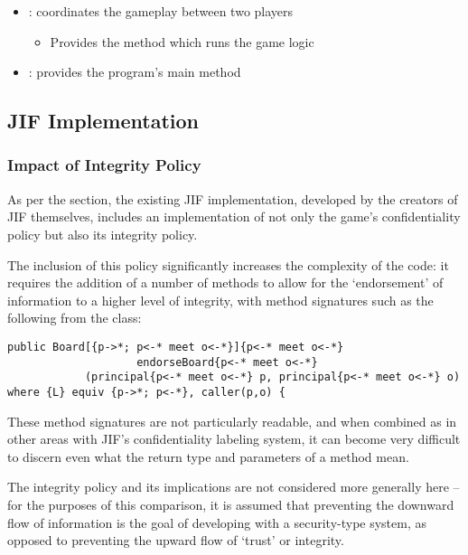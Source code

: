\begin{itemize}
	\item {}: coordinates the gameplay between two players
	
	\begin{itemize}
		\item Provides the method which runs the game logic
	\end{itemize}
	
	\item {}: provides the program's main method
\end{itemize}

\newpage

\subsection{JIF Implementation} \label{cs_battleships_jif_impl}

\subsubsection{Impact of Integrity Policy}

As per the  section, the existing JIF implementation, developed by the creators of JIF themselves, includes an implementation of not only the game's confidentiality policy but also its integrity policy.

The inclusion of this policy significantly increases the complexity of the code: it requires the addition of a number of methods to allow for the `endorsement' of information to a higher level of integrity, with method signatures such as the following from the  class:

\begin{verbatim}
public Board[{p->*; p<-* meet o<-*}]{p<-* meet o<-*} 
					endorseBoard{p<-* meet o<-*}
			(principal{p<-* meet o<-*} p, principal{p<-* meet o<-*} o)
where {L} equiv {p->*; p<-*}, caller(p,o) {
\end{verbatim}

These method signatures are not particularly readable, and when combined as in other areas with JIF's confidentiality labeling system, it can become very difficult to discern even what the return type and parameters of a method mean.

The integrity policy and its implications are not considered more generally here -- for the purposes of this comparison, it is assumed that preventing the downward flow of information is the goal of developing with a security-type system, as opposed to preventing the upward flow of `trust' or integrity.

